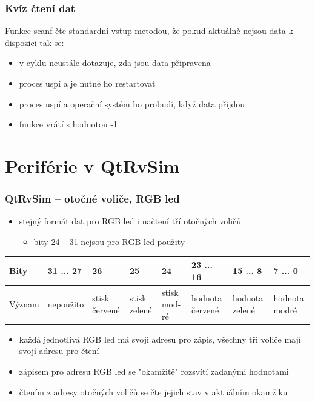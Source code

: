 \documentclass{beamer}
\begin{document}
\begin{frame}
\frametitle{Kvíz čtení dat}

Funkce scanf čte standardní vstup metodou, že pokud aktuálně nejsou data k dispozici tak se:
\begin{itemize}
\item[A] v cyklu neustále dotazuje, zda jsou data připravena 
\item[B] proces uspí a je nutné ho restartovat
\item[C] proces uspí a operační systém ho probudí, když data přijdou
\item[D] funkce vrátí s hodnotou -1
\end{itemize}
\end{frame}



\section{Periférie v QtRvSim}

\begin{frame}
\frametitle{QtRvSim -- otočné voliče, RGB led}

\begin{itemize}
\item stejný formát dat pro RGB led i načtení tří otočných voličů 
\begin{itemize}
\item bity 24 -- 31 nejsou pro RGB led použity
\end{itemize}
\end{itemize}

\begin{table}
\scriptsize
\begin{tabular}{|m{1.0cm}|m{1.1cm}|m{0.5cm}|m{0.5cm}|m{0.5cm}|m{1.1cm}|m{1.1cm}|m{1.1cm}|}\hline
Bity & 31 ... 27 & 26 & 25 & 24 & 23 ... 16 & 15 ... 8 & 7 ... 0 \\ \hline
Význam & nepoužito & stisk červené & stisk zelené & stisk mod- ré & hodnota červené & hodnota zelené & hodnota modré \\ \hline
\end{tabular}
\end{table}


\begin{itemize}
\item každá jednotlivá RGB led má svoji adresu pro zápis, všechny tři voliče mají svojí adresu pro čtení
\item zápisem pro adresu RGB led se "okamžitě" rozsvítí zadanými hodnotami
\item čtením z adresy otočných voličů se čte jejich stav v aktuálním okamžiku
\end{itemize}

\end{frame}
\end{document}
